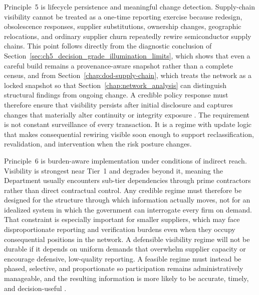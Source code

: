 Principle~5 is lifecycle persistence and meaningful change detection. Supply-chain visibility cannot be treated as a one-time reporting exercise because redesign, obsolescence responses, supplier substitutions, ownership changes, geographic relocations, and ordinary supplier churn repeatedly rewire semiconductor supply chains. This point follows directly from the diagnostic conclusion of Section~\ref{sec:ch5_decision_grade_illumination_limits}, which shows that even a careful build remains a provenance-aware snapshot rather than a complete census, and from Section~\ref{chap:dod-supply-chain}, which treats the network as a locked snapshot so that Section~\ref{chap:network_analysis} can distinguish structural findings from ongoing change. A credible policy response must therefore ensure that visibility persists after initial disclosure and captures changes that materially alter continuity or integrity exposure \parencite{ch5_dod2022_supplychains,ch5_dodi424515}. The requirement is not constant surveillance of every transaction. It is a regime with update logic that makes consequential rewiring visible soon enough to support reclassification, revalidation, and intervention when the risk posture changes.

Principle~6 is burden-aware implementation under conditions of indirect reach. Visibility is strongest near Tier~1 and degrades beyond it, meaning the Department usually encounters sub-tier dependencies through prime contractors rather than direct contractual control. Any credible regime must therefore be designed for the structure through which information actually moves, not for an idealized system in which the government can interrogate every firm on demand. That constraint is especially important for smaller suppliers, which may face disproportionate reporting and verification burdens even when they occupy consequential positions in the network. A defensible visibility regime will not be durable if it depends on uniform demands that overwhelm supplier capacity or encourage defensive, low-quality reporting. A feasible regime must instead be phased, selective, and proportionate so participation remains administratively manageable, and the resulting information is more likely to be accurate, timely, and decision-useful \parencite{ch5_dod2022_supplychains,ch5_usc2223}.

